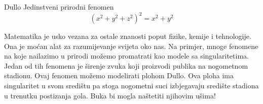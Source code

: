 \begin{surferPage}{Dullo}
Jedinstveni prirodni fenomen\\
\smallskip
\[(x^2+ y^2+ z^2)^2	= x^2+ y^2\]

\singlespacing
Matematika je usko vezana za ostale znanosti poput fizike, kemije i tehnologije. Ona je mo\'{c}an alat za razumijevanje svijeta oko nas.
\singlespacing
Na primjer, mnoge fenomene na koje nailazimo u prirodi mo\v{z}emo promatrati kao modele sa singularitetima.
\singlespacing
Jedan od tih fenomena je \v{s}irenje zvuka koji proizvodi publika na nogometnom stadionu. Ovaj fenomen mo\v{z}emo modelirati plohom Dullo. Ova ploha ima singularitet u svom sredi\v{s}tu pa stoga nogometni suci izbjegavaju sredi\v{s}te stadiona u trenutku postizanja gola. Buka bi mogla na\v{s}tetiti njihovim u\v{s}ima!

\end{surferPage}
